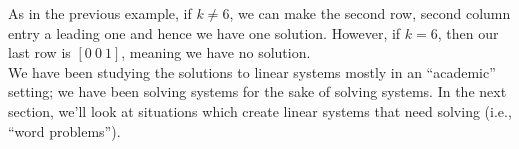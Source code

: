 As in the previous example, if $k\neq6$, we can make the second row, second column entry a leading one and hence we have one solution. However, if $k=6$, then our last row is $[0\ 0\ 1]$, meaning we have no solution.\\

We have been studying the solutions to linear systems mostly in an ``academic'' setting; we have been solving systems for the sake of solving systems. In the next section, we'll look at situations which create linear systems that need solving (i.e., ``word problems'').\\



